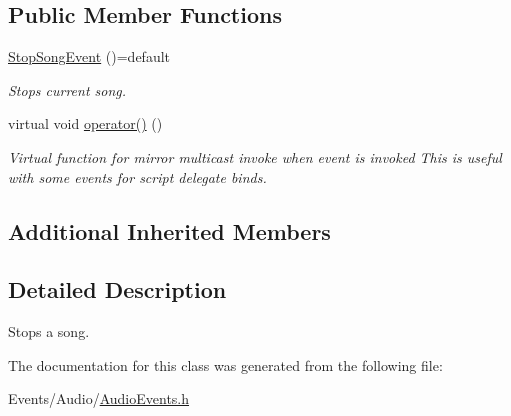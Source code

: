 \subsection*{Public Member Functions}
\begin{DoxyCompactItemize}
\item 
\mbox{\label{classStopSongEvent_a375b120e6551e7d1392ef3bba86e5bf4}} 
\hyperlink{classStopSongEvent_a375b120e6551e7d1392ef3bba86e5bf4}{Stop\+Song\+Event} ()=default
\begin{DoxyCompactList}\small\item\em Stops current song. \end{DoxyCompactList}\item 
\mbox{\label{classStopSongEvent_acf45616f9648eae1bdb0c89f290fea1b}} 
virtual void \hyperlink{classStopSongEvent_acf45616f9648eae1bdb0c89f290fea1b}{operator()} ()
\begin{DoxyCompactList}\small\item\em Virtual function for mirror multicast invoke when event is invoked This is useful with some events for script delegate binds. \end{DoxyCompactList}\end{DoxyCompactItemize}
\subsection*{Additional Inherited Members}


\subsection{Detailed Description}
Stops a song. 

The documentation for this class was generated from the following file\+:\begin{DoxyCompactItemize}
\item 
Events/\+Audio/\hyperlink{AudioEvents_8h}{Audio\+Events.\+h}\end{DoxyCompactItemize}
